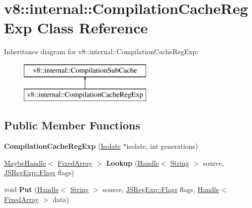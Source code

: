 \hypertarget{classv8_1_1internal_1_1_compilation_cache_reg_exp}{}\section{v8\+:\+:internal\+:\+:Compilation\+Cache\+Reg\+Exp Class Reference}
\label{classv8_1_1internal_1_1_compilation_cache_reg_exp}
Inheritance diagram for v8\+:\+:internal\+:\+:Compilation\+Cache\+Reg\+Exp\+:\begin{figure}[H]
\begin{center}
\leavevmode
\includegraphics[height=2.000000cm]{classv8_1_1internal_1_1_compilation_cache_reg_exp}
\end{center}
\end{figure}
\subsection*{Public Member Functions}
\begin{DoxyCompactItemize}
\item 
\hypertarget{classv8_1_1internal_1_1_compilation_cache_reg_exp_ada53fa1cf4c913dba298fc11f491324b}{}{\bfseries Compilation\+Cache\+Reg\+Exp} (\hyperlink{classv8_1_1internal_1_1_isolate}{Isolate} $\ast$isolate, int generations)\label{classv8_1_1internal_1_1_compilation_cache_reg_exp_ada53fa1cf4c913dba298fc11f491324b}

\item 
\hypertarget{classv8_1_1internal_1_1_compilation_cache_reg_exp_a0bb213af930b7215707b5da49f142ba8}{}\hyperlink{classv8_1_1internal_1_1_maybe_handle}{Maybe\+Handle}$<$ \hyperlink{classv8_1_1internal_1_1_fixed_array}{Fixed\+Array} $>$ {\bfseries Lookup} (\hyperlink{classv8_1_1internal_1_1_handle}{Handle}$<$ \hyperlink{classv8_1_1internal_1_1_string}{String} $>$ source, \hyperlink{classv8_1_1internal_1_1_j_s_reg_exp_1_1_flags}{J\+S\+Reg\+Exp\+::\+Flags} flags)\label{classv8_1_1internal_1_1_compilation_cache_reg_exp_a0bb213af930b7215707b5da49f142ba8}

\item 
\hypertarget{classv8_1_1internal_1_1_compilation_cache_reg_exp_aba3d849c1552a2c1327504221f81279c}{}void {\bfseries Put} (\hyperlink{classv8_1_1internal_1_1_handle}{Handle}$<$ \hyperlink{classv8_1_1internal_1_1_string}{String} $>$ source, \hyperlink{classv8_1_1internal_1_1_j_s_reg_exp_1_1_flags}{J\+S\+Reg\+Exp\+::\+Flags} flags, \hyperlink{classv8_1_1internal_1_1_handle}{Handle}$<$ \hyperlink{classv8_1_1internal_1_1_fixed_array}{Fixed\+Array} $>$ data)\label{classv8_1_1internal_1_1_compilation_cache_reg_exp_aba3d849c1552a2c1327504221f81279c}

\end{DoxyCompactItemize}
